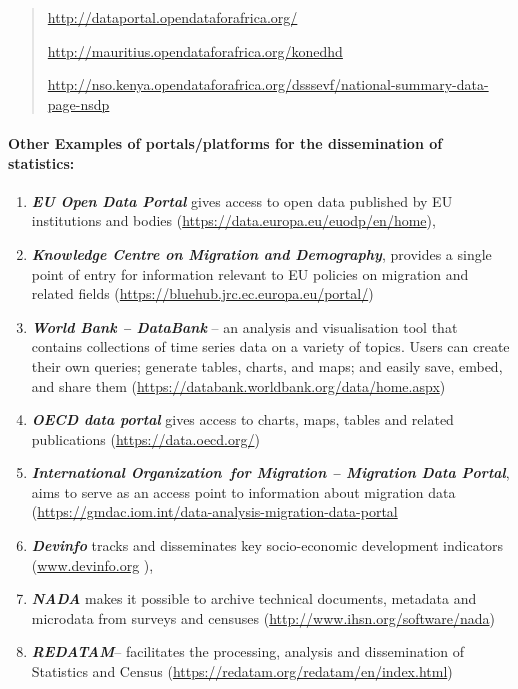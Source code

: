 \documentclass[
]{article}
\begin{document}
\begin{quote}
\url{http://dataportal.opendataforafrica.org/}

\url{http://mauritius.opendataforafrica.org/konedhd}

\url{http://nso.kenya.opendataforafrica.org/dsssevf/national-summary-data-page-nsdp}
\end{quote}

\hypertarget{other-examples-of-portalsplatforms-for-the-dissemination-of-statistics-1}{%
\paragraph{Other Examples of portals/platforms for the dissemination of statistics:}\label{other-examples-of-portalsplatforms-for-the-dissemination-of-statistics-1}}

\begin{enumerate}
\def\labelenumi{\roman{enumi}.}
\item
  \textbf{\emph{EU Open Data Portal}} gives access to open data published by EU
  institutions and bodies (\url{https://data.europa.eu/euodp/en/home}),
\item
  \textbf{\emph{Knowledge Centre on Migration and Demography}}, provides a
  single point of entry for information relevant to EU policies on
  migration and related fields
  (\url{https://bluehub.jrc.ec.europa.eu/portal/})
\item
  \textbf{\emph{World Bank -- DataBank}} -- an analysis and visualisation tool
  that contains collections of time series data on a variety of
  topics. Users can create their own queries; generate tables, charts,
  and maps; and easily save, embed, and share them
  (\url{https://databank.worldbank.org/data/home.aspx})
\item
  \textbf{\emph{OECD data portal}} gives access to charts, maps, tables and
  related publications (\url{https://data.oecd.org/})
\item
  \textbf{\emph{International Organization~for Migration -- Migration Data
  Portal}}, aims to serve as an access point to information about
  migration data
  (\url{https://gmdac.iom.int/data-analysis-migration-data-portal}
\item
  \textbf{\emph{Devinfo}} tracks and disseminates key socio-economic development
  indicators (\href{http://www.devinfo.org}{www.devinfo.org} ),
\item
  \textbf{\emph{NADA}} makes it possible to archive technical documents,
  metadata and microdata from surveys and censuses
  (\url{http://www.ihsn.org/software/nada})
\item
  \textbf{\emph{REDATAM}}-- facilitates the processing, analysis and
  dissemination of Statistics and Census
  (\url{https://redatam.org/redatam/en/index.html})
\end{enumerate}
\end{document}
